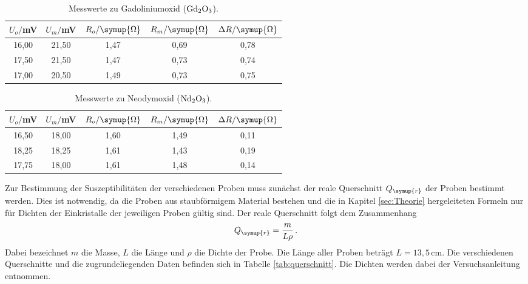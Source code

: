 \begin{table}[htp]
	\begin{center}
    \caption{Messwerte zu Gadoliniumoxid ($\ce{Gd2O3}$).}
    \label{tab:gadolinium}
		\begin{tabular}{ccccc}
		\toprule
			{$U_o/$mV} & {$U_m/$mV} & {$R_o/\symup{\Omega}$} & {$R_m/\symup{\Omega}$} & {$\Delta R/\symup{\Omega}$}\\
			\midrule
			16,00 & 21,50 & 1,47 & 0,69 & 0,78\\
			17,50 & 21,50 & 1,47 & 0,73 & 0,74\\
			17,00 & 20,50 & 1,49 & 0,73 & 0,75\\
		\bottomrule
		\end{tabular}
	\end{center}
\end{table}



\begin{table}[htp]
	\begin{center}
    \caption{Messwerte zu Neodymoxid ($\ce{Nd2O3}$).}
    \label{tab:neodym}
		\begin{tabular}{ccccc}
		\toprule
			{$U_o/$mV} & {$U_m/$mV} & {$R_o/\symup{\Omega}$} & {$R_m/\symup{\Omega}$} & {$\Delta R/\symup{\Omega}$}\\
			\midrule
			16,50 & 18,00 & 1,60 & 1,49 & 0,11\\
			18,25 & 18,25 & 1,61 & 1,43 & 0,19\\
			17,75 & 18,00 & 1,61 & 1,48 & 0,14\\
		\bottomrule
		\end{tabular}
	\end{center}
\end{table}


Zur Bestimmung der Suszeptibilitäten der verschiedenen Proben muss zunächst
der reale Querschnitt $Q_{\symup{r}}$ der Proben bestimmt werden. Dies ist notwendig,
da die Proben aus staubförmigem Material bestehen und die in Kapitel \ref{sec:Theorie}
hergeleiteten Formeln nur für Dichten der Einkristalle der jeweiligen Proben
gültig sind. Der reale Querschnitt folgt dem Zusammenhang
\begin{align}
  Q_{\symup{r}}=\frac{m}{L\rho} \,.
\end{align}
Dabei bezeichnet $m$ die Masse, $L$ die Länge und $\rho$ die Dichte der Probe. Die
Länge aller Proben beträgt $L=13,5\,$cm. Die verschiedenen Querschnitte und die zugrundeliegenden
Daten befinden sich in Tabelle \ref{tab:querschnitt}. Die Dichten werden dabei der
Versuchsanleitung \cite{Versuchsanleitung} entnommen.

